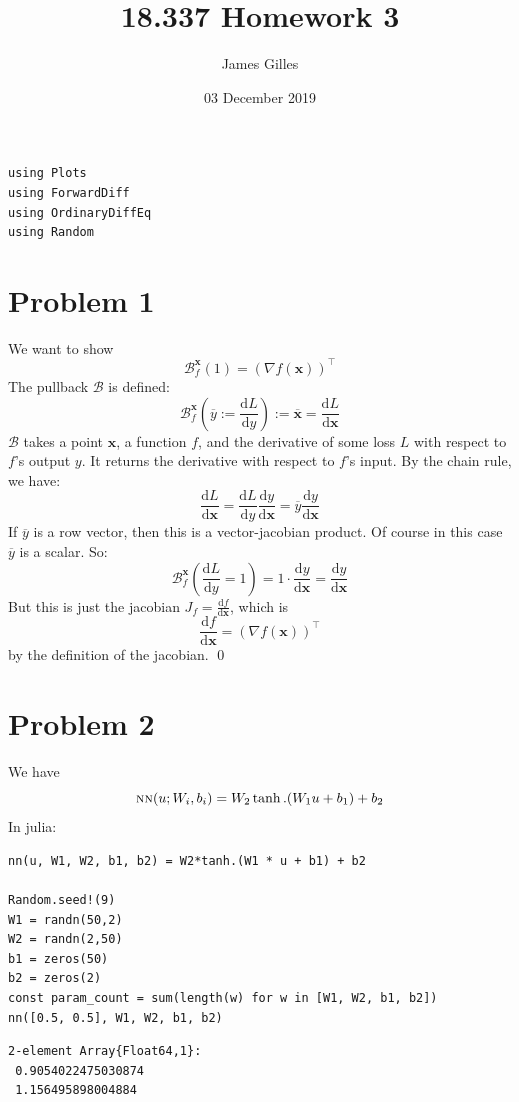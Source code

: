 \documentclass[11pt]{article}
\author{James Gilles}
\date{03 December 2019}
\title{18.337 Homework 3}
\newcommand{\B}[0]{\mathcal{B}}
\newcommand{\xv}[0]{\mathbf{x}}
\newcommand*\lgrad[1]{\overline{#1}}
\newcommand*\tderiv[2]{\frac{\mathrm{d}#1}{\mathrm{d}#2}}
\newcommand{\NN}[0]{\textsc{nn}}
\newcommand{\transpose}[1]{#1 ^\top}
\renewcommand*{\tableofcontents}[0]{}
\begin{document}
\maketitle
\tableofcontents

\begin{verbatim}
using Plots
using ForwardDiff
using OrdinaryDiffEq
using Random
\end{verbatim}

\section{Problem 1}
\label{sec:orgc27cdc4}
We want to show
$$\B_f^\xv(1) = \transpose{(\nabla f(\xv))}$$
The pullback \(\B\) is defined:
$$\B^\xv_f(\lgrad{y} := \tderiv{L}{y}) := \lgrad{\xv} = \tderiv{L}{\xv}$$
\(\B\) takes a point \(\xv\), a function \(f\), and the derivative of some loss \(L\) with respect to \(f\)'s output \(y\).
It returns the derivative with respect to \(f\)'s input.
By the chain rule, we have:
$$\tderiv{L}{\xv} = \tderiv{L}{y}\tderiv{y}{\xv} = \lgrad{y} \tderiv{y}{\xv}$$
If \(\lgrad{y}\) is a row vector, then this is a vector-jacobian product. Of course in this case \(\lgrad{y}\) is a scalar.
So:
$$\B^\xv_f(\tderiv{L}{y} = 1) = 1 \cdot \tderiv{y}{\xv} = \tderiv{y}{\xv}$$
But this is just the jacobian \(J_f=\tderiv{f}{\xv}\), which is
$$\tderiv{f}{\xv}=\transpose{(\nabla f(\xv))}$$
by the definition of the jacobian. \qed
\section{Problem 2}
\label{sec:orgcecf3b6}
We have $$\NN(u; W_i, b_i) = W_2 \tanh.(W_1 u + b_1) + b_2$$
In julia:
\begin{verbatim}
nn(u, W1, W2, b1, b2) = W2*tanh.(W1 * u + b1) + b2

Random.seed!(9)
W1 = randn(50,2)
W2 = randn(2,50)
b1 = zeros(50)
b2 = zeros(2)
const param_count = sum(length(w) for w in [W1, W2, b1, b2])
nn([0.5, 0.5], W1, W2, b1, b2)
\end{verbatim}

\begin{verbatim}
2-element Array{Float64,1}:
 0.9054022475030874
 1.156495898004884 
\end{verbatim}
\end{document}
